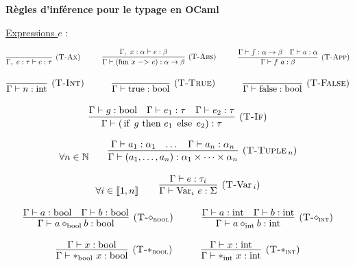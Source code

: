 \documentclass[11pt]{article}
\begin{document}
\begin{definition}
    \textbf{Règles d'inférence pour le typage en OCaml}

    \underline{Expressions $e$} :

    $$
    \infer[(\text{\scshape{T-Ax}})] 
    {\Gamma,~e:\tau\vdash e:\tau}{}
    ~~~~~~~~~
    \infer[(\text{\scshape{T-Abs}})]
    {\Gamma\vdash(\text{\lstinline|fun|}~x~\text{\lstinline|->|}~e):\alpha\to\beta}
    {\Gamma,~x:\alpha\vdash e:\beta}
    ~~~~~~~~~
    \infer[(\text{\scshape{T-App}})]
    {\Gamma \vdash f~a:\beta}
    {\Gamma\vdash f:\alpha\to\beta & \Gamma\vdash a:\alpha}
    $$

    $$
    \infer[(\text{\scshape{T-Int}})] 
    {\Gamma\vdash n:\text{int}}{}
    ~~~~~~~~~
    \infer[(\text{\scshape{T-True}})] 
    {\Gamma\vdash \text{true}:\text{bool}}{}
    ~~~~~~~~~
    \infer[(\text{\scshape{T-False}})] 
    {\Gamma\vdash \text{false}:\text{bool}}{}
    $$

    $$
    \infer[(\text{\scshape{T-If}})] 
    {\Gamma \vdash (\text{\lstinline|if|}~g~\text{\lstinline|then|}~e_1~\text{\lstinline|else|}~e_2):\tau}
    {
        \Gamma \vdash g:\text{bool}
        &
        \Gamma \vdash e_1:\tau
        &
        \Gamma \vdash e_2:\tau
    }
    $$
    
    $$
    \forall n\in\mathbb{N}~~~~~~
    \infer[(\text{\scshape{T-Tuple$\,_n$}})]
    {\Gamma\vdash (a_1, \dots, a_n) : \alpha_1\times\dots\times\alpha_n}
    {
        \Gamma\vdash a_1:\alpha_1&
        \dots&
        \Gamma\vdash a_n:\alpha_n
    }
    $$

    $$\forall i\in\left\llbracket1, n\right\rrbracket~~~~~~
    \infer[(\text{{\scshape{T-}}\text{Var}$\,_i$})]
    {\Gamma \vdash \text{Var}_i~e:\Sigma}
    {\Gamma \vdash e:\tau_i}
    $$

    $$
    \infer[(\text{\scshape{T-$\diamond_\text{bool}$}})] 
    {\Gamma \vdash a \diamond_\text{bool} b:\text{bool}}
    {
        \Gamma \vdash a:\text{bool}&
        \Gamma \vdash b:\text{bool}
    }
    ~~~~~~~~~
    \infer[(\text{\scshape{T-$\diamond_\text{int}$}})] 
    {\Gamma \vdash a \diamond_\text{int} b:\text{int}}
    {
        \Gamma \vdash a:\text{int}&
        \Gamma \vdash b:\text{int}
    }
    $$

    $$
    \infer[(\text{\scshape{T-$\ast_\text{bool}$}})] 
    {\Gamma \vdash \ast_\text{bool}~x:\text{bool}}
    {\Gamma \vdash x:\text{bool}}
    ~~~~~~~~~
    \infer[(\text{\scshape{T-$\ast_\text{int}$}})] 
    {\Gamma \vdash \ast_\text{int}~x:\text{int}}
    {\Gamma \vdash x:\text{int}}
    $$


\end{definition}
\end{document}
